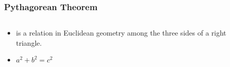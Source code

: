 \begin{module}[id=pythagoreantheorem]
\begin{frame}
  \frametitle{Pythagorean Theorem}
  \begin{columns}
    \begin{column}{5.8cm}
      \begin{itemize}
      \item
      \begin{definition}
         is a relation in Euclidean geometry among the three sides of a right triangle.
      \end{definition}
      \item $a^2+b^2 = c^2$
    \end{itemize}
    \end{column}
    \begin{column}{5.5cm}
    \end{column}
  \end{columns}
\end{frame}
\end{module}
